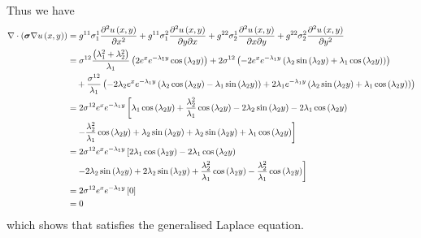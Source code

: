 Thus we have
\begin{equation}
  \begin{aligned}
    \divergence{}{\pbrac{\conductivitytensor\gradient{}\fnof{u}{x,y}}}&=
    \generalmetrictensorsymbol^{11}\conductivitytensorsymbol^{1}_{1}\deltwosqby{\fnof{u}{x,y}}{x}
    +\generalmetrictensorsymbol^{11}\conductivitytensorsymbol^{2}_{1}\deltwoby{\fnof{u}{x,y}}{y}{x}
    +\generalmetrictensorsymbol^{22}\conductivitytensorsymbol^{1}_{2}\deltwoby{\fnof{u}{x,y}}{x}{y}
    +\generalmetrictensorsymbol^{22}\conductivitytensorsymbol^{2}_{2}\deltwosqby{\fnof{u}{x,y}}{y}\\
    &=\conductivitytensorsymbol^{12}\dfrac{\pbrac{\lambda_{1}^{2}+\lambda_{2}^{2}}}{\lambda_{1}}
    \pbrac{2e^{x}e^{-\lambda_{1}{y}}\cosine{\lambda_{2}y}}+
    2\conductivitytensorsymbol^{12}\pbrac{-2e^{x}e^{-\lambda_{1}{y}}\pbrac{\lambda_{2}\sine{\lambda_{2}y}+
        \lambda_{1}\cosine{\lambda_{2}y}}}\\
    &\quad+\dfrac{\conductivitytensorsymbol^{12}}{\lambda_{1}}
    \pbrac{-2\lambda_{2}e^{x}e^{-\lambda_{1}{y}}\pbrac{\lambda_{2}\cosine{\lambda_{2}y}-\lambda_{1}\sine{\lambda_{2}y}}+
      2\lambda_{1}e^{-\lambda_{1}{y}}\pbrac{\lambda_{2}\sine{\lambda_{2}y}+\lambda_{1}\cosine{\lambda_{2}y}}}\\
    &=2\conductivitytensorsymbol^{12}e^{x}e^{-\lambda_{1}y}\left[
      \lambda_{1}\cosine{\lambda_{2}y}
      +\dfrac{\lambda_{2}^{2}}{\lambda_{1}}\cosine{\lambda_{2}y}
      -2\lambda_{2}\sine{\lambda_{2}y}
      -2\lambda_{1}\cosine{\lambda_{2}y}\right.\\
      &\quad\left.-\dfrac{\lambda_{2}^{2}}{\lambda_{1}}\cosine{\lambda_{2}y}
      +\lambda_{2}\sine{\lambda_{2}y}
      +\lambda_{2}\sine{\lambda_{2}y}
      +\lambda_{1}\cosine{\lambda_{2}y}\right]\\
    &=2\conductivitytensorsymbol^{12}e^{x}e^{-\lambda_{1}y}\left[2\lambda_{1}\cosine{\lambda_{2}y}-2\lambda_{1}\cosine{\lambda_{2}y}
      \right.\\
      &\quad\left.-2\lambda_{2}\sine{\lambda_{2}y}+2\lambda_{2}\sine{\lambda_{2}y}
      +\dfrac{\lambda_{2}^{2}}{\lambda_{1}}\cosine{\lambda_{2}y}
      -\dfrac{\lambda_{2}^{2}}{\lambda_{1}}\cosine{\lambda_{2}y}\right]\\
    &=2\conductivitytensorsymbol^{12}e^{x}e^{-\lambda_{1}y}\sqbrac{0}\\
    &=0
  \end{aligned}
\end{equation}
which shows that  satisfies the generalised Laplace equation.

